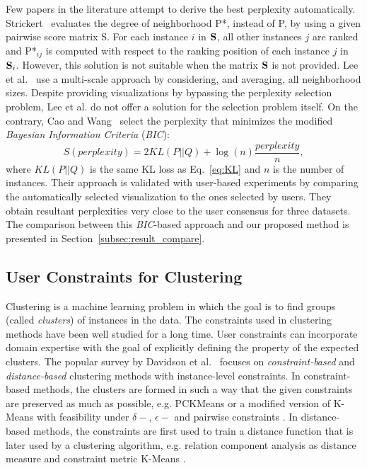 Few papers in the literature attempt to derive the best perplexity automatically.
Strickert~\cite{strickert2012} evaluates the degree of neighborhood P*, instead of P, by using a given pairwise score matrix S. For each instance $i$ in ${\bf S}$, all other instances $j$ are ranked and {P*}$_{ij}$ is computed with respect to the ranking position of each instance $j$ in ${\bf S}_i$. However, this solution is not suitable when the matrix ${\bf S}$ is not provided.
Lee et al.~\cite{lee2014} use a multi-scale approach by considering, and averaging, all neighborhood sizes. Despite providing visualizations by bypassing the perplexity selection problem, Lee et al. do not offer a solution for the selection problem itself.
On the contrary, Cao and Wang~\cite{cao2017automatic} select the perplexity that minimizes the modified \emph{Bayesian Information Criteria} (\emph{BIC}):
\begin{equation}
S(\textit{perplexity}) = 2KL(P||Q) + \log(n)\frac{\textit{perplexity}}{n},
\end{equation}
where $KL(P||Q)$ is the same KL loss as Eq.~\ref{eq:KL} and $n$ is the number of instances.
Their approach is validated with user-based experiments by comparing the automatically selected visualization to the ones selected by users. They obtain resultant perplexities very close to the user consensus for three datasets. The comparison between this \emph{BIC}-based approach and our proposed method is presented in Section~\ref{subsec:result_compare}.

\subsection{User Constraints for Clustering}
\label{subsec:constraints_clustering}

Clustering is a machine learning problem in which the goal is to find groups (called \emph{clusters}) of instances in the data. The constraints used in clustering methods have been well studied for a long time. User constraints can incorporate domain expertise with the goal of explicitly defining the property of the expected clusters.
The popular survey by Davidson et al.~\cite{Davidson2007surveyClt} focuses on \emph{constraint-based} and \emph{distance-based} clustering methods with instance-level constraints.
In constraint-based methods, the clusters are formed in such a way that the given constraints are preserved as much as possible, e.g. PCKMeans \cite{basu2004active} or a modified version of K-Means with feasibility under $\delta-$, $\epsilon-$ and pairwise constraints \cite{davidson2005clustering}.
In distance-based methods, the constraints are first used to train a distance function that is later used by a clustering algorithm, e.g. relation component analysis as distance measure \cite{bar2003learning} and constraint metric K-Means \cite{xing2003distance}.

